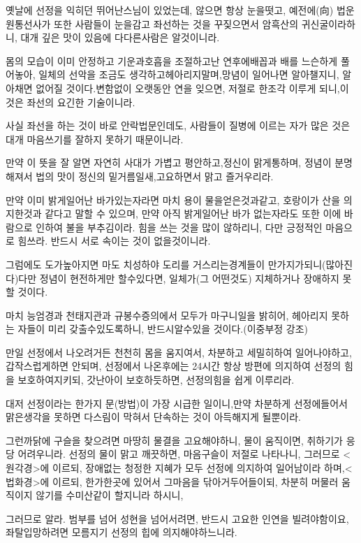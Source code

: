 \documentclass[12pt, a4paper, oneside]{book}
\begin{document}
옛날에 선정을 익히던 뛰어난스님이 있었는데, 않으면 항상 눈을떳고, 예전에(向) 법운원통선사가 또한 사람들이 눈을감고 좌선하는 것을 꾸짖으면서 암흑산의 귀신굴이라하니, 대개 깊은 맛이 있음에 다다른사람은 알것이니라.

몸의 모습이 이미 안정하고 기운과호흡을 조절하고난 연후에배꼽과 배를 느슨하게 풀어놓아, 일체의 선악을 조금도 생각하고헤아리지말며,망념이 일어나면 알아챌지니, 알아채면 없어질 것이다.변함없이 오랫동안 연을 잊으면, 저절로 한조각 이루게 되니,이것은 좌선의 요긴한 기술이니라.

사실 좌선을 하는 것이 바로 안락법문인데도, 사람들이 질병에 이르는 자가 많은 것은 대개 마음쓰기를 잘하지 못하기 때문이니라.

만약 이 뜻을 잘 알면 자연히 사대가 가볍고 평안하고,정신이 맑게통하며, 정념이 분명해져서 법의 맛이 정신의 밑거름일새,고요하면서 맑고 즐거우리라.

만약 이미 밝게일어난 바가있는자라면 마치 용이 물을얻은것과같고, 호랑이가 산을 의지한것과 같다고 말할 수 있으며, 만약 아직 밝게일어난 바가 없는자라도 또한 이에 바람으로 인하여 불을 부추김이라. 힘을 쓰는 것을 많이 않하리니, 다만 긍정적인 마음으로 힘쓰라. 반드시 서로 속이는 것이 없을것이니라.

그럼에도 도가높아지면 마도 치성하야 도리를 거스리는경계들이 만가지가되니(많아진다)다만 정념이 현전하게만 할수있다면, 일체가(그 어떤것도) 지체하거나 장애하지 못할 것이다.

마치 능엄경과 천태지관과 규봉수증의에서 모두가 마구니일을 밝히어, 헤아리지 못하는 자들이 미리 갖출수있도록하니, 반드시알수있을 것이다.(이중부정 강조)

만일 선정에서 나오려거든 천천히 몸을 움지여서, 차분하고 세밀히하여 일어나야하고, 갑작스럽게하면 안되며, 선정에서 나온후에는 24시간 항상 방편에 의지하여 선정의 힘을 보호하여지키되, 갓난아이 보호하듯하면, 선정의힘을 쉽게 이루리라.

대저 선정이라는 한가지 문(방법)이 가장 시급한 일이니,만약 차분하게 선정에들어서 맑은생각을 못하면 다스림이 막혀서 단속하는 것이 아득해지게 될뿐이라.

그런까닭에 구슬을 찾으려면 마땅히 물결을 고요해야하니, 물이 움직이면, 취하기가 응당 어려우니라. 선정의 물이 맑고 깨끗하면, 마음구슬이 저절로 나타나니, 그러므로 <원각경>에 이르되, 장애없는 청정한 지혜가 모두 선정에 의지하여 일어남이라 하며,<법화경>에 이르되, 한가한곳에 있어서 그마음을 닦아거두어들이되, 차분히 머물러 움직이지 않기를 수미산같이 할지니라 하시니,

그러므로 알라. 범부를 넘어 성현을 넘어서려면, 반드시 고요한 인연을 빌려야함이요, 좌탈입망하려면 모름지기 선정의 힙에 의지해야하느니라.
\end{document}
